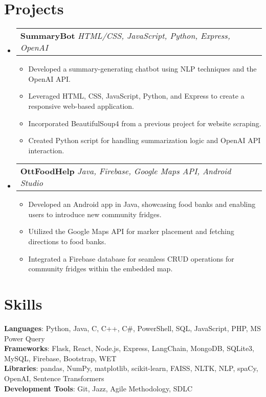 \documentclass[letterpaper,11pt]{article}
\makeatletter
\newcommand{\resumeItem}[1]{
  \item\small{
    {#1 \vspace{-2pt}}
  }
}
\newcommand{\resumeSubheading}[3]{
    \item
    \begin{tabular*}{0.97\textwidth}[t]{l@{\extracolsep{\fill}}r}
      \textbf{#1} \textbar \textit{ #2} & \textbf{#3} \\
    \end{tabular*}\vspace{-4.5pt}
}
\newcommand{\resumeSubHeadingListStart}{\begin{itemize}[leftmargin=0.15in, label={}]}
\newcommand{\resumeSubHeadingListEnd}{\end{itemize}}
\newcommand{\resumeItemListStart}{\begin{itemize}}
\newcommand{\resumeItemListEnd}{\end{itemize}\vspace{-5pt}}
\makeatother
\begin{document}
\section{\textbf{\Large Projects}}
    \resumeSubHeadingListStart
        \resumeSubheading{SummaryBot}{HTML/CSS, JavaScript, Python, Express, OpenAI}{}
            \resumeItemListStart
                \resumeItem{Developed a summary-generating chatbot using NLP techniques and the OpenAI API.}
                \resumeItem{Leveraged HTML, CSS, JavaScript, Python, and Express to create a responsive web-based application.}
                \resumeItem{Incorporated BeautifulSoup4 from a previous project for website scraping.}
                \resumeItem{Created Python script for handling summarization logic and OpenAI API interaction.}
            \resumeItemListEnd

        \resumeSubheading{OttFoodHelp}{Java, Firebase, Google Maps API, Android Studio}{}
            \resumeItemListStart
            \resumeItem{Developed an Android app in Java, showcasing food banks and enabling users to introduce new community fridges.}
            \resumeItem{Utilized the Google Maps API for marker placement and fetching directions to food banks.}
                \resumeItem{Integrated a Firebase database for seamless CRUD operations for community fridges within the embedded map.}
            \resumeItemListEnd
        \resumeSubHeadingListEnd

\section{\textbf{\Large Skills}}
 \begin{itemize}[leftmargin=0.15in, label={}]
    \small{\item{
     \textbf{Languages}{: Python, Java, C, C++, C\#, PowerShell, SQL, JavaScript, PHP, MS Power Query} \\
     \textbf{Frameworks}{: Flask, React, Node.js, Express, LangChain, MongoDB, SQLite3, MySQL, Firebase, Bootstrap, WET} \\
     \textbf{Libraries}{: pandas, NumPy, matplotlib, scikit-learn, FAISS, NLTK, NLP, spaCy, OpenAI, Sentence Transformers} \\
     \textbf{Development Tools}{: Git, Jazz, Agile Methodology, SDLC} \\
    }}
 \end{itemize}


\end{document}
